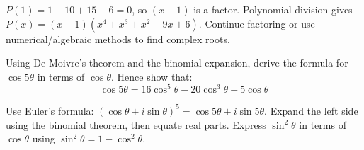 \begin{solution}[Sketch]
$P(1) = 1-10+15-6=0$, so $(x-1)$ is a factor. Polynomial division gives $P(x) = (x-1)(x^4+x^3+x^2-9x+6)$. Continue factoring or use numerical/algebraic methods to find complex roots.
\end{solution}

\begin{problem}
Using De Moivre's theorem and the binomial expansion, derive the formula for $\cos 5\theta$ in terms of $\cos\theta$. Hence show that:
\[
\cos 5\theta = 16\cos^5\theta - 20\cos^3\theta + 5\cos\theta
\]
\end{problem}

\begin{hint}
Use Euler's formula: $(\cos\theta + i\sin\theta)^5 = \cos 5\theta + i\sin 5\theta$. Expand the left side using the binomial theorem, then equate real parts. Express $\sin^2\theta$ in terms of $\cos\theta$ using $\sin^2\theta = 1 - \cos^2\theta$.
\end{hint}

